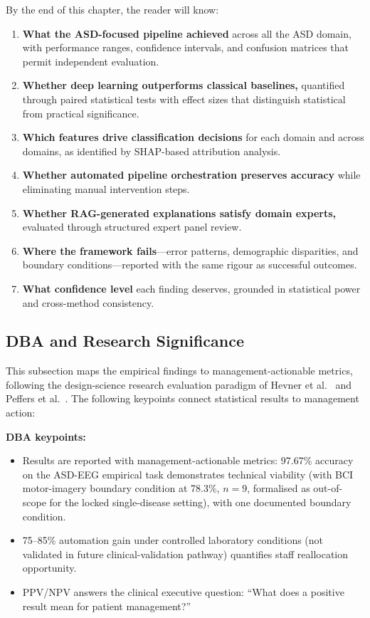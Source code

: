 By the end of this chapter, the reader will know:

\begin{enumerate}[label=(\alph*)]
    \item \textbf{What the ASD-focused pipeline achieved} across all the ASD domain, with performance ranges, confidence intervals, and confusion matrices that permit independent evaluation.
    \item \textbf{Whether deep learning outperforms classical baselines,} quantified through paired statistical tests with effect sizes that distinguish statistical from practical significance.
    \item \textbf{Which features drive classification decisions} for each domain and across domains, as identified by SHAP-based attribution analysis.
    \item \textbf{Whether automated pipeline orchestration preserves accuracy} while eliminating manual intervention steps.
    \item \textbf{Whether RAG-generated explanations satisfy domain experts,} evaluated through structured expert panel review.
    \item \textbf{Where the framework fails}---error patterns, demographic disparities, and boundary conditions---reported with the same rigour as successful outcomes.
    \item \textbf{What confidence level} each finding deserves, grounded in statistical power and cross-method consistency.
\end{enumerate}

\subsection{DBA and Research Significance}

This subsection maps the empirical findings to management-actionable metrics, following the design-science research evaluation paradigm of Hevner et al.~\cite{hevner2004design} and Peffers et al.~\cite{peffers2007dsr}. The following keypoints connect statistical results to management action:

\noindent\textbf{DBA keypoints:}
\begin{itemize}[leftmargin=*, itemsep=3pt]
    \item Results are reported with management-actionable metrics: 97.67\% accuracy on the ASD-EEG empirical task demonstrates technical viability (with BCI motor-imagery boundary condition at 78.3\%, $n=9$, formalised as out-of-scope for the locked single-disease setting), with one documented boundary condition.
    \item 75--85\% automation gain under controlled laboratory conditions (not validated in future clinical-validation pathway) quantifies staff reallocation opportunity.
    \item PPV/NPV answers the clinical executive question: ``What does a positive result mean for patient management?''
\end{itemize}

